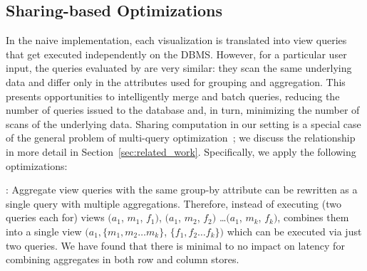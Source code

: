 
\subsection{Sharing-based Optimizations}
\label{sec:sharing_opt}


In the naive implementation, each visualization is translated into view
queries that get executed independently on the DBMS.
However, for a particular user input, the queries evaluated by \SeeDB
are very similar: they scan the same underlying data and differ only in the 
attributes used for grouping and aggregation.
This presents opportunities to intelligently merge and batch queries, reducing 
the number of queries issued to the database and, in turn, minimizing the number 
of scans of the underlying data.
Sharing computation in our setting is a special case of the general problem
of multi-query optimization~\cite{DBLP:journals/tods/Sellis88}; we discuss the 
relationship in more detail in Section~\ref{sec:related_work}.
Specifically, we apply the following optimizations:

: Aggregate view queries 
with the same group-by attribute can be 
rewritten as a single query with multiple aggregations. 
Therefore, instead of executing
(two queries each for) views $(a_1$, $m_1$, $f_1)$, $(a_1$, $m_2$, $f_2)$ 
\ldots $(a_1$, $m_k$, $f_k)$, \SeeDB combines them into a single view 
$(a_1, \{m_1, m_2\ldots m_k\}$, $\{f_1, f_2\ldots f_k\})$ which can be executed via just
two queries.  
We have found that there is minimal to no impact on latency 
for combining aggregates in both row and column stores. 

